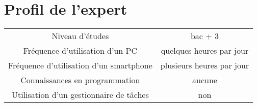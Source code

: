 \documentclass[11pt]{article}
\begin{document}
\appendix

\section{Profil de l'expert}
\label{sec:profilExpert}

\begin{tabular}[h]{c|c}
  Niveau d'études & bac + 3\\
  Fréquence d'utilisation d'un PC & quelques heures par jour\\
  Fréquence d'utilisation d'un smartphone & plusieurs heures par jour\\
  Connaissances en programmation & aucune\\
  Utilisation d'un gestionnaire de tâches & non\\

\end{tabular}
\end{document}
